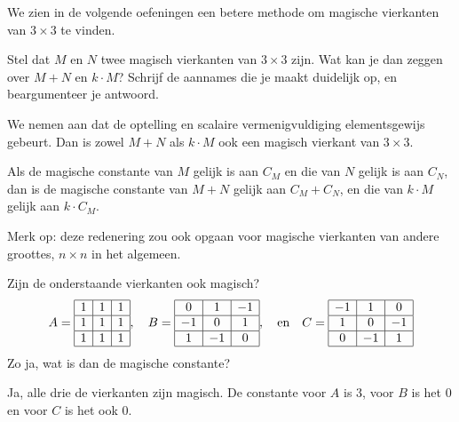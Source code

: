 \documentclass{ximera}
\begin{document}
\begin{exercise}
\begin{oplossing}
        We zien in de volgende oefeningen een betere methode om magische vierkanten van \(3 \times 3\) te vinden.        
    \end{oplossing}
\end{exercise}

\begin{exercise}
    Stel dat \(M\) en \(N\) twee magisch vierkanten van \(3\times 3\) zijn.
    Wat kan je dan zeggen over \(M + N\) en \(k \cdot M\)?
    Schrijf de aannames die je maakt duidelijk op, en beargumenteer je antwoord.
    \begin{oplossing}
        We nemen aan dat de optelling en scalaire vermenigvuldiging elementsgewijs gebeurt.
        Dan is zowel \(M + N\) als \(k \cdot M\) ook een magisch vierkant van \(3 \times 3\).

        Als de magische constante van \(M\) gelijk is aan \(C_M\) en die van \(N\) gelijk is aan \(C_N\), dan is de magische constante van \(M + N\) gelijk aan \(C_M + C_N\), en die van \(k \cdot M\) gelijk aan \(k \cdot C_M\).

        Merk op: deze redenering zou ook opgaan voor magische vierkanten van andere groottes, \(n \times n \) in het algemeen.
    \end{oplossing}
\end{exercise}

\begin{exercise}
    Zijn de onderstaande vierkanten ook magisch?
    \[
    A=
    \begin{array}{|c|c|c|}
    \hline
    1 & 1 & 1 \\
    \hline
    1 & 1 & 1 \\
    \hline
    1 & 1 & 1 \\
    \hline
    \end{array}
    , \quad
    B=
    \begin{array}{|c|c|c|}
    \hline
    0 & 1 & -1 \\
    \hline
    -1 & 0 & 1 \\
    \hline
    1 & -1 & 0 \\
    \hline
    \end{array}
    , \quad \text{en} \quad
    C=
    \begin{array}{|c|c|c|}
    \hline
    -1 & 1 & 0 \\
    \hline
    1 & 0 & -1 \\
    \hline
    0 & -1 & 1 \\
    \hline
    \end{array}
    \]
    Zo ja, wat is dan de magische constante?
    \begin{oplossing}
        Ja, alle drie de vierkanten zijn magisch.
        De constante voor \(A\) is \(3\), voor \(B\) is het \(0\) en voor \(C\) is het ook \(0\).
    \end{oplossing}
\end{exercise}
\end{document}
